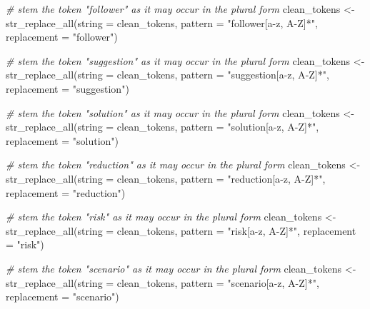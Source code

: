 \documentclass[
]{article}
\newenvironment{Shaded}{\begin{snugshade}}{\end{snugshade}}
\newcommand{\AttributeTok}[1]{\textcolor[rgb]{0.77,0.63,0.00}{#1}}
\newcommand{\CommentTok}[1]{\textcolor[rgb]{0.56,0.35,0.01}{\textit{#1}}}
\newcommand{\FunctionTok}[1]{\textcolor[rgb]{0.00,0.00,0.00}{#1}}
\newcommand{\NormalTok}[1]{#1}
\newcommand{\OtherTok}[1]{\textcolor[rgb]{0.56,0.35,0.01}{#1}}
\newcommand{\StringTok}[1]{\textcolor[rgb]{0.31,0.60,0.02}{#1}}
\begin{document}
\begin{Shaded}
\begin{Highlighting}[]
\CommentTok{\# stem the token "follower" as it may occur in the plural form}
\NormalTok{clean\_tokens }\OtherTok{\textless{}{-}} \FunctionTok{str\_replace\_all}\NormalTok{(}\AttributeTok{string =}\NormalTok{ clean\_tokens,}
                                \AttributeTok{pattern =} \StringTok{"follower[a{-}z, A{-}Z]*"}\NormalTok{, }
                                \AttributeTok{replacement =} \StringTok{"follower"}\NormalTok{)}

\CommentTok{\# stem the token "suggestion" as it may occur in the plural form}
\NormalTok{clean\_tokens }\OtherTok{\textless{}{-}} \FunctionTok{str\_replace\_all}\NormalTok{(}\AttributeTok{string =}\NormalTok{ clean\_tokens,}
                                \AttributeTok{pattern =} \StringTok{"suggestion[a{-}z, A{-}Z]*"}\NormalTok{, }
                                \AttributeTok{replacement =} \StringTok{"suggestion"}\NormalTok{)}

\CommentTok{\# stem the token "solution" as it may occur in the plural form}
\NormalTok{clean\_tokens }\OtherTok{\textless{}{-}} \FunctionTok{str\_replace\_all}\NormalTok{(}\AttributeTok{string =}\NormalTok{ clean\_tokens,}
                                \AttributeTok{pattern =} \StringTok{"solution[a{-}z, A{-}Z]*"}\NormalTok{, }
                                \AttributeTok{replacement =} \StringTok{"solution"}\NormalTok{)}

\CommentTok{\# stem the token "reduction" as it may occur in the plural form}
\NormalTok{clean\_tokens }\OtherTok{\textless{}{-}} \FunctionTok{str\_replace\_all}\NormalTok{(}\AttributeTok{string =}\NormalTok{ clean\_tokens,}
                                \AttributeTok{pattern =} \StringTok{"reduction[a{-}z, A{-}Z]*"}\NormalTok{, }
                                \AttributeTok{replacement =} \StringTok{"reduction"}\NormalTok{)}

\CommentTok{\# stem the token "risk" as it may occur in the plural form}
\NormalTok{clean\_tokens }\OtherTok{\textless{}{-}} \FunctionTok{str\_replace\_all}\NormalTok{(}\AttributeTok{string =}\NormalTok{ clean\_tokens,}
                                \AttributeTok{pattern =} \StringTok{"risk[a{-}z, A{-}Z]*"}\NormalTok{, }
                                \AttributeTok{replacement =} \StringTok{"risk"}\NormalTok{)}

\CommentTok{\# stem the token "scenario" as it may occur in the plural form}
\NormalTok{clean\_tokens }\OtherTok{\textless{}{-}} \FunctionTok{str\_replace\_all}\NormalTok{(}\AttributeTok{string =}\NormalTok{ clean\_tokens,}
                                \AttributeTok{pattern =} \StringTok{"scenario[a{-}z, A{-}Z]*"}\NormalTok{, }
                                \AttributeTok{replacement =} \StringTok{"scenario"}\NormalTok{)}


\end{Highlighting}
\end{Shaded}
\end{document}
